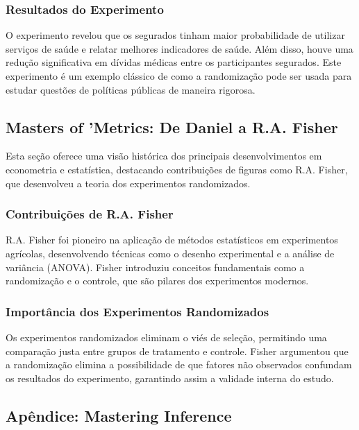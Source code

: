 \documentclass[a4paper,12pt]{article}[abntex2]
\begin{document}
\subsubsection*{Resultados do Experimento}

O experimento revelou que os segurados tinham maior probabilidade de utilizar serviços de saúde e relatar melhores indicadores de saúde. Além disso, houve uma redução significativa em dívidas médicas entre os participantes segurados. Este experimento é um exemplo clássico de como a randomização pode ser usada para estudar questões de políticas públicas de maneira rigorosa.

\subsection*{Masters of 'Metrics: De Daniel a R.A. Fisher}

Esta seção oferece uma visão histórica dos principais desenvolvimentos em econometria e estatística, destacando contribuições de figuras como R.A. Fisher, que desenvolveu a teoria dos experimentos randomizados.

\subsubsection*{Contribuições de R.A. Fisher}

R.A. Fisher foi pioneiro na aplicação de métodos estatísticos em experimentos agrícolas, desenvolvendo técnicas como o desenho experimental e a análise de variância (ANOVA). Fisher introduziu conceitos fundamentais como a randomização e o controle, que são pilares dos experimentos modernos.

\subsubsection*{Importância dos Experimentos Randomizados}

Os experimentos randomizados eliminam o viés de seleção, permitindo uma comparação justa entre grupos de tratamento e controle. Fisher argumentou que a randomização elimina a possibilidade de que fatores não observados confundam os resultados do experimento, garantindo assim a validade interna do estudo.

\subsection*{Apêndice: Mastering Inference}
\end{document}
